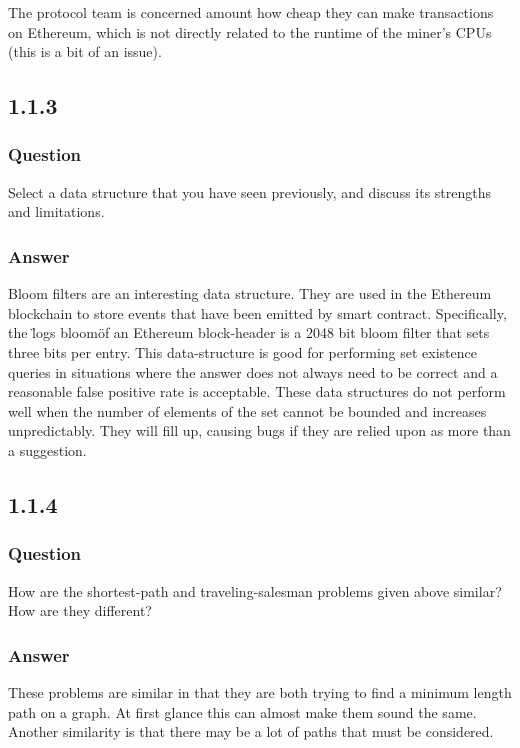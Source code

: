 \documentclass{article}
\begin{document}
                The protocol team is concerned amount how cheap they can make transactions on Ethereum, which is not directly
                related to the runtime of the miner's CPUs (this is a bit of an issue).

        \subsection{1.1.3}
            \subsubsection{Question}
                Select a data structure that you have seen previously, and discuss its strengths and limitations.

            \subsubsection{Answer}
                Bloom filters are an interesting data structure. They are used in the Ethereum blockchain to store events
                that have been emitted by smart contract. Specifically, the \"logs bloom\" of an Ethereum block-header is
                a 2048 bit bloom filter that sets three bits per entry. This data-structure is good for performing set existence
                queries in situations where the answer does not always need to be correct and a reasonable false positive rate
                is acceptable. These data structures do not perform well when the number of elements of the set cannot be
                bounded and increases unpredictably. They will fill up, causing bugs if they are relied upon as more than
                a suggestion.
        \subsection{1.1.4}
            \subsubsection{Question}
                How are the shortest-path and traveling-salesman problems given above similar? How are they different?

            \subsubsection{Answer}
                These problems are similar in that they are both trying to find a minimum length path on a graph. At first
                glance this can almost make them sound the same. Another similarity is that there may be a lot of paths that
                must be considered.
\end{document}
